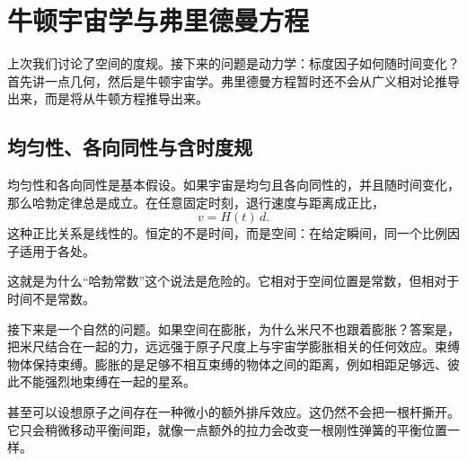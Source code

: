 \chapter{牛顿宇宙学与弗里德曼方程}

上次我们讨论了空间的度规。接下来的问题是动力学：标度因子如何随时间变化？首先讲一点几何，然后是牛顿宇宙学。弗里德曼方程暂时还不会从广义相对论推导出来，而是将从牛顿方程推导出来。

\section{均匀性、各向同性与含时度规}

均匀性和各向同性是基本假设。如果宇宙是均匀且各向同性的，并且随时间变化，那么哈勃定律总是成立。在任意固定时刻，退行速度与距离成正比，
\begin{equation}
v = H(t)\,d.
\end{equation}
这种正比关系是线性的。恒定的不是时间，而是空间：在给定瞬间，同一个比例因子适用于各处。

\begin{classroomqa}
\end{classroomqa}

这就是为什么``哈勃常数''这个说法是危险的。它相对于空间位置是常数，但相对于时间不是常数。

接下来是一个自然的问题。如果空间在膨胀，为什么米尺不也跟着膨胀？答案是，把米尺结合在一起的力，远远强于原子尺度上与宇宙学膨胀相关的任何效应。束缚物体保持束缚。膨胀的是足够不相互束缚的物体之间的距离，例如相距足够远、彼此不能强烈地束缚在一起的星系。

\begin{classroomqa}
\end{classroomqa}

甚至可以设想原子之间存在一种微小的额外排斥效应。这仍然不会把一根杆撕开。它只会稍微移动平衡间距，就像一点额外的拉力会改变一根刚性弹簧的平衡位置一样。

\begin{classroomqa}
\end{classroomqa}

